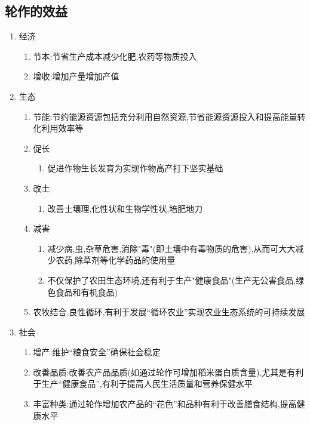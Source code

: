 \documentclass[a4paper]{article}
\begin{document}
    \subsection{轮作的效益}
    \begin{enumerate}
        \item 经济
        \begin{enumerate}
            \item 节本:节省生产成本减少化肥,农药等物质投入
            \item 增收:增加产量增加产值
        \end{enumerate}
        \item 生态
        \begin{enumerate}
            \item 节能:节约能源资源包括充分利用自然资源,节省能源资源投入和提高能量转化利用效率等 %
            \item 促长
            \begin{enumerate}
                \item 促进作物生长发育为实现作物高产打下坚实基础 %
            \end{enumerate}
            \item 改土
            \begin{enumerate}
                \item 改善士壤理,化性状和生物学性状,培肥地力 %
            \end{enumerate}
            \item 减害
            \begin{enumerate}
                \item 减少病,虫,杂草危害,消除"毒"(即土壤中有毒物质的危害),从而可大大减少农药,除草剂等化学药品的使用量
                \item 不仅保护了农田生态环境,还有利于生产"健康食品"(生产无公害食品,绿色食品和有机食品)
            \end{enumerate}
            \item 农牧结合,良性循环,有利于发展“循环农业”实现农业生态系统的可持续发展
        \end{enumerate}
        \item 社会
        \begin{enumerate}
            \item 增产:维护“粮食安全”确保社会稳定
            \item 改善品质:改善农产品品质(如通过轮作可增加稻米蛋白质含量),尤其是有利于生产“健康食品”,有利于提高人民生活质量和营养保健水平
            \item 丰富种类:通过轮作增加农产品的“花色”和品种有利于改善膳食结构,提高健康水平
        \end{enumerate}
    \end{enumerate}
\end{document}
